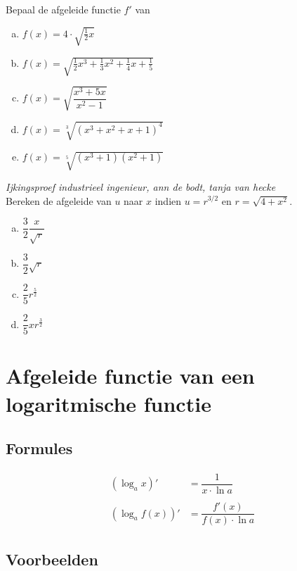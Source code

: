 \documentclass[12pt]{article}
\begin{document}
\begin{oefening}
Bepaal de afgeleide functie $f'$ van\\
\begin{enumerate}[(a)]
  \itemsep0.5em
  \item $\displaystyle f(x)=4\cdot\sqrt{\frac{1}{2}x}$
  \item $\displaystyle f(x)=\sqrt{\frac{1}{2}x^3+\frac{1}{3}x^2+\frac{1}{4}x+\frac{1}{5}}$
  \item $\displaystyle f(x)=\sqrt{\dfrac{x^3+5x}{x^2-1}}$
  \item $\displaystyle f(x)=\sqrt[3]{\left(x^3+x^2+x+1\right)^4}$
  \item $\displaystyle f(x)=\sqrt[5]{\left(x^3+1\right)\left(x^2+1\right)}$
\end{enumerate}
\end{oefening}

\begin{oefening}
{\em \scriptsize Ijkingsproef industrieel ingenieur, ann de bodt, tanja van hecke}\\
Bereken de afgeleide van $u$ naar $x$ indien $u=r^{3/2}$ en $r=\sqrt{4+x^2}$.
\begin{enumerate}[(a)]
  \itemsep.3em
  \item $\dfrac{3}{2}\dfrac{x}{\sqrt{r}}$
  \item $\dfrac{3}{2}\sqrt{r}$
  \item $\dfrac{2}{5}r^\frac{5}{2}$
  \item $\dfrac{2}{5}xr^\frac{3}{2}$
\end{enumerate}
\end{oefening}

\pagebreak
\section{Afgeleide functie van een logaritmische functie}

\subsection{Formules}

\begin{align*}
  (\log_a x)' &= \dfrac{1}{x\cdot \ln a}\\\\
  (\log_a f(x))' &= \dfrac{f'(x)}{f(x)\cdot \ln a} 
\end{align*}

\subsection{Voorbeelden}
\end{document}
